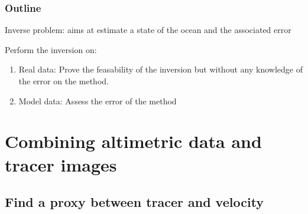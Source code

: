 \documentclass[compress,slidescentered,notes=show]{beamer}
\begin{document}
\begin{frame}
  \frametitle{Outline}

  \begin{block}{}
    Inverse problem: aims at estimate a state of the ocean and the associated error
  \end{block}
 
  \begin{block}{Perform the inversion on:}
  \begin{enumerate}
    \item Real data: Prove the feasability of the inversion but without any knowledge of the error on the method. 
    \item Model data: Assess the error of the method
  \end{enumerate}
  \end{block}
\end{frame}

\section[Method]{Combining altimetric data and tracer images}

\subsection[proxy FSLE]{Find a proxy between tracer and velocity}
\end{document}
